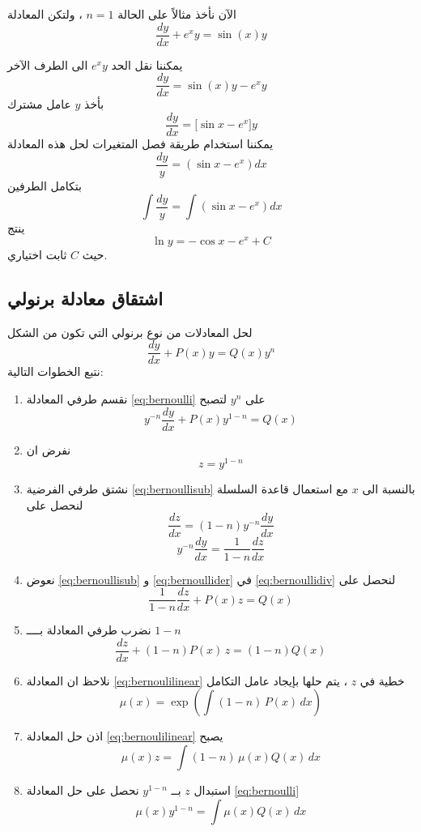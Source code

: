 \begin{example}
	الآن نأخذ مثالاً على الحالة $n=1 $ ، ولتكن المعادلة 
	\[
	\frac{dy}{dx} + e^x y = \sin(x) y
	\]
\end{example}
\begin{solution}
	يمكننا نقل الحد $e^x y$ الى الطرف الآخر
	\[
	\frac{dy}{dx} = \sin(x) y - e^x y
	\]
	بأخذ $y$ عامل مشترك
	\[
	\frac{dy}{dx} = \Big[\sin x - e^x\Big] y
	\]
	يمكننا استخدام طريقة فصل المتغيرات لحل هذه المعادلة
	\[
	\frac{dy}{y} = (\sin x - e^x) dx
	\]
	بتكامل الطرفين
	\[
	\int \frac{dy}{y} = \int (\sin x - e^x) dx
	\]
	ينتج
	\[
	\ln y = -\cos x - e^x + C
	\]
	حيث $C$ ثابت اختياري.
\end{solution}

\newpage
\subsection*{اشتقاق معادلة برنولي}
لحل المعادلات من نوع برنولي التي تكون من الشكل
\[
\frac{dy}{dx} + P(x) y = Q(x) y^n \tag{1}
\]
 نتبع الخطوات التالية:
\begin{enumerate}[label=$\bullet$]
	\item نقسم طرفي المعادلة \eqref{eq:bernoulli} على $y^n$ لتصبح
	\begin{equation}
		\label{eq:bernoullidiv}
		y^{-n} \frac{dy}{dx} + P(x) y^{1-n}= Q(x)
	\end{equation}
	
	\item نفرض ان 
	\begin{equation}
		\label{eq:bernoullisub}
		z=y^{1-n}
	\end{equation}
	\item نشتق طرفي الفرضية \eqref{eq:bernoullisub} بالنسبة الى $x$ مع استعمال قاعدة السلسلة لنحصل على 
	\[
	\frac{dz}{dx} = (1-n)y^{-n} \frac{dy}{dx}
	\]
	\begin{equation}
		\label{eq:bernoullider}
		 y^{-n}\frac{dy}{dx} = \frac{1}{1-n}\frac{dz}{dx}
	\end{equation}
	
	\item نعوض \eqref{eq:bernoullisub} و \eqref{eq:bernoullider} في \eqref{eq:bernoullidiv} لنحصل على 
	\begin{equation*}
		\frac{1}{1-n} \frac{dz}{dx} + P(x) z = Q(x)
	\end{equation*}
	
	\item نضرب طرفي المعادلة بــــ $1-n$
	\begin{equation}
		\label{eq:bernoulilinear}
		\frac{dz}{dx} + (1-n)P(x) \, z = (1-n)Q(x)
	\end{equation}
	 

	\item نلاحظ ان المعادلة \eqref{eq:bernoulilinear} خطية في $z$ ، يتم حلها بإيجاد عامل التكامل
	\[
	\mu(x) = \exp\left(\int (1-n)\, P(x) \, dx\right)
	\]
	
	\item اذن حل المعادلة \eqref{eq:bernoulilinear} يصبح
	\[
	\mu(x) z = \int (1-n)\, \mu(x) Q(x) \, dx
	\]
	\item استبدال $z$ بــ $y^{1-n}$ نحصل على حل المعادلة \eqref{eq:bernoulli}
	\[
	\mu(x) y^{1-n} = \int \mu(x) Q(x)\, dx
	\]
\end{enumerate}
